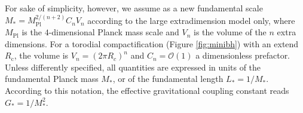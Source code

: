 For sake of simplicity, however, we assume as a new fundamental scale $M_* = 
M_\text{Pl}^{2/(n+2)} C_n V_n$ according to the large extradimension model 
only, where $M_\text{Pl}$ is  the $4$-dimensional Planck mass scale and $V_n$ 
is the volume of the $n$ extra dimensions.  For a torodial compactification
(Figure \ref{fig:minibh}) with an 
extend $R_\text{c}$, the volume is $V_n = (2\pi R_c)^n$ and 
$C_n=\mathcal{O}(1)$ a dimensionless prefactor.
Unless differently specified, all quantities 
are expressed in units of the fundamental Planck mass $M_*$, or of the 
fundamental length $L_*=1/M_*$. According to this notation, the effective 
gravitational coupling constant reads $G_*=1/M_*^2$.






